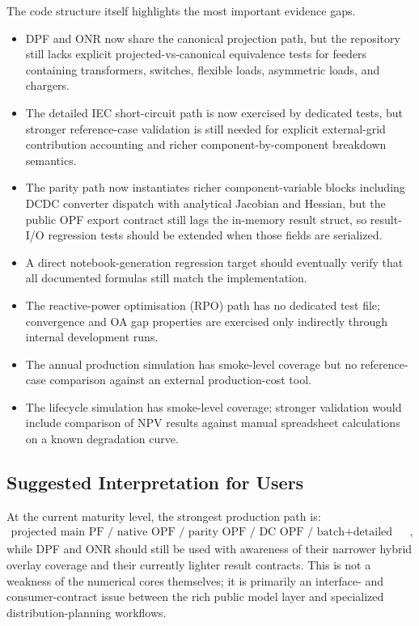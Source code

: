 The code structure itself highlights the most important evidence gaps.
\begin{itemize}
  \item DPF and ONR now share the canonical projection path, but the repository still lacks explicit projected-vs-canonical equivalence tests for feeders containing transformers, switches, flexible loads, asymmetric loads, and chargers.
  \item The detailed IEC short-circuit path is now exercised by dedicated tests, but stronger reference-case validation is still needed for explicit external-grid contribution accounting and richer component-by-component breakdown semantics.
  \item The parity path now instantiates richer component-variable blocks including DCDC converter dispatch with analytical Jacobian and Hessian, but the public OPF export contract still lags the in-memory result struct, so result-I/O regression tests should be extended when those fields are serialized.
  \item A direct notebook-generation regression target should eventually verify that all documented formulas still match the implementation.
  \item The reactive-power optimisation (RPO) path has no dedicated test file; convergence and OA gap properties are exercised only indirectly through internal development runs.
  \item The annual production simulation has smoke-level coverage but no reference-case comparison against an external production-cost tool.
  \item The lifecycle simulation has smoke-level coverage; stronger validation would include comparison of NPV results against manual spreadsheet calculations on a known degradation curve.
\end{itemize}

\subsection{Suggested Interpretation for Users}

At the current maturity level, the strongest production path is:
\begin{align}
\text{projected main PF / native OPF / parity OPF / DC OPF / batch+detailed SC / annual sim},
\end{align}
while DPF and ONR should still be used with awareness of their narrower hybrid
overlay coverage and their currently lighter result contracts.  This is not a
weakness of the numerical cores themselves; it is primarily an interface- and
consumer-contract issue between the rich public model layer and specialized
distribution-planning workflows.

